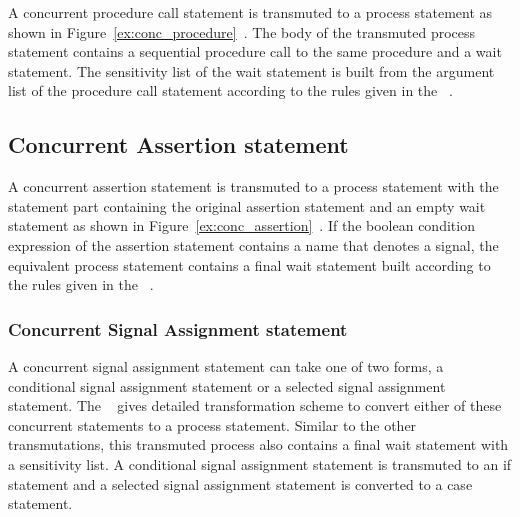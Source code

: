 \documentclass[11pt]{article}
\begin{document}
A concurrent procedure call statement is transmuted to a process
statement as shown in Figure~\ref{ex:conc_procedure}~.
The body of the transmuted process statement contains a sequential
procedure call to the same procedure and a wait statement.  The
sensitivity list of the wait statement is built from the argument list
of the procedure call statement according to the rules given in the
\LRM~.

\subsection{Concurrent Assertion statement}


A concurrent assertion statement is transmuted to a process statement
with the statement part containing the original assertion statement
and an empty wait statement as shown in
Figure~\ref{ex:conc_assertion}~.  If the boolean condition
expression of the assertion statement contains a name that denotes a
signal, the equivalent process statement contains a final wait
statement built according to the rules given in the \LRM~.
  
\subsubsection{Concurrent Signal Assignment statement}

A concurrent signal assignment statement can take one of two forms, a
conditional signal assignment statement or a selected signal
assignment statement.  The \LRM~ gives detailed
transformation scheme to convert either of these concurrent statements
to a process statement.  Similar to the other transmutations, this
transmuted process also contains a final wait statement with a
sensitivity list.  A conditional signal assignment statement is
transmuted to an if statement and a selected signal assignment
statement is converted to a case statement.
\end{document}
